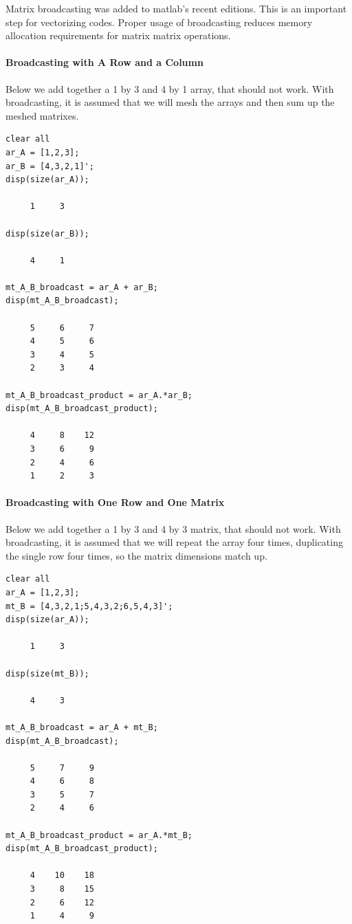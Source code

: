 \documentclass[
]{book}
\begin{document}
Matrix broadcasting was added to matlab's recent editions. This is an
important step for vectorizing codes. Proper usage of broadcasting
reduces memory allocation requirements for matrix matrix operations.

\hypertarget{broadcasting-with-a-row-and-a-column}{%
\paragraph{Broadcasting with A Row and a Column}\label{broadcasting-with-a-row-and-a-column}}

Below we add together a 1 by 3 and 4 by 1 array, that should not work.
With broadcasting, it is assumed that we will mesh the arrays and then
sum up the meshed matrixes.

\begin{verbatim}
clear all
ar_A = [1,2,3];
ar_B = [4,3,2,1]';
disp(size(ar_A));

     1     3

disp(size(ar_B));

     4     1

mt_A_B_broadcast = ar_A + ar_B;
disp(mt_A_B_broadcast);

     5     6     7
     4     5     6
     3     4     5
     2     3     4

mt_A_B_broadcast_product = ar_A.*ar_B;
disp(mt_A_B_broadcast_product);

     4     8    12
     3     6     9
     2     4     6
     1     2     3
\end{verbatim}

\hypertarget{broadcasting-with-one-row-and-one-matrix}{%
\paragraph{Broadcasting with One Row and One Matrix}\label{broadcasting-with-one-row-and-one-matrix}}

Below we add together a 1 by 3 and 4 by 3 matrix, that should not work.
With broadcasting, it is assumed that we will repeat the array four
times, duplicating the single row four times, so the matrix dimensions
match up.

\begin{verbatim}
clear all
ar_A = [1,2,3];
mt_B = [4,3,2,1;5,4,3,2;6,5,4,3]';
disp(size(ar_A));

     1     3

disp(size(mt_B));

     4     3

mt_A_B_broadcast = ar_A + mt_B;
disp(mt_A_B_broadcast);

     5     7     9
     4     6     8
     3     5     7
     2     4     6

mt_A_B_broadcast_product = ar_A.*mt_B;
disp(mt_A_B_broadcast_product);

     4    10    18
     3     8    15
     2     6    12
     1     4     9
\end{verbatim}
\end{document}
